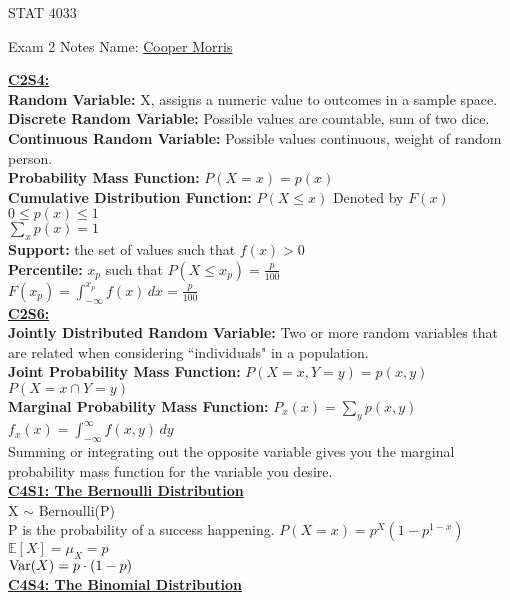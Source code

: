 \documentclass[letter, 12pt]{article}
\begin{document}
\begin{center}
STAT 4033
\end{center}
Exam 2 Notes \hfill Name: \uline{Cooper Morris}
\begin{multicols}{2}
\textbf{\uline{C2S4:}}\\
\textbf{Random Variable:} X, assigns a numeric value to outcomes in a sample space.\\
\textbf{Discrete Random Variable:} Possible values are countable, sum of two dice.\\
\textbf{Continuous Random Variable:} Possible values continuous, weight of random person.\\
\textbf{Probability Mass Function:} \(P(X=x) = p(x)\) \\
\textbf{Cumulative Distribution Function:} \(P(X\leq x) \) Denoted by \(F(x)\) \\
\(0\leq p(x) \leq 1\)\\
\(\sum_xp(x) = 1\)\\
\textbf{Support:} the set of values such that \(f(x) > 0	\)\\
\textbf{Percentile:} \(x_p\) such that \(P(X\leq x_p) = \frac{p}{100}\)\\
\(F(x_p) = \int_{-\infty}^{x_p} f(x)\,dx = \frac{p}{100}\)\\
\textbf{\uline{C2S6:}}\\
\textbf{Jointly Distributed Random Variable:} Two or more random variables that are related when considering ``individuals" in a population.\\
\textbf{Joint Probability Mass Function:} \(P(X=x, Y=y) = p(x,y)\) \(P(X=x \cap Y=y)\) \\
\textbf{Marginal Probability Mass Function:} \(P_x(x) = \sum_y p(x,y)\)\\
\(f_x(x) = \int_{-\infty}^\infty f(x,y)\,dy\)\\
Summing or integrating out the opposite variable gives you the marginal probability mass function for the variable you desire.\\
\textbf{\uline{C4S1: The Bernoulli Distribution}}\\
X \(\sim\) Bernoulli(P)\\
P is the probability of a success happening. 
\(P(X=x) = p^X(1-p^{1-x})\)\\
\(\mathds{E}[X] = \mu_X = p\)\\
\(\textnormal{Var}(X) = p\cdot(1-p)\)\\
\textbf{\uline{C4S4: The Binomial Distribution}}\\

\end{multicols}
\end{document}
